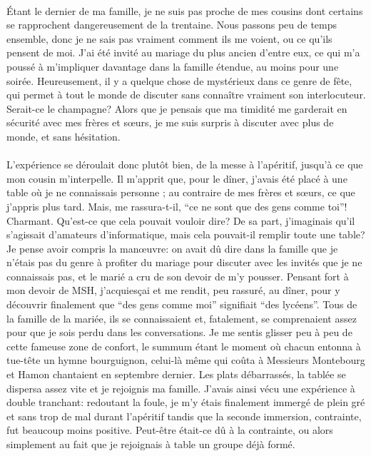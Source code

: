 \paragraph{} Étant le dernier de ma famille, je ne suis pas proche de mes
cousins dont certains se rapprochent dangereusement de la trentaine. Nous
passons peu de temps ensemble, donc je ne sais pas vraiment comment ils me
voient, ou ce qu'ils pensent de moi. J'ai été invité au mariage du plus ancien
d'entre eux, ce qui m'a poussé à m'impliquer davantage dans la famille étendue,
au moins pour une soirée. Heureusement, il y a quelque chose de mystérieux dans
ce genre de fête, qui permet à tout le monde de discuter sans connaître
vraiment son interlocuteur. Serait-ce le champagne? Alors que je pensais que
ma timidité me garderait en sécurité avec mes frères et sœurs, je me suis
surpris à discuter avec plus de monde, et sans hésitation.

\paragraph{} L'expérience se déroulait donc plutôt bien, de la messe à
l'apéritif, jusqu'à ce que mon cousin m'interpelle. Il m'apprit que, pour le
dîner, j'avais été placé à une table où je ne connaissais personne ; au
contraire de mes frères et sœurs, ce que j'appris plus tard. Mais, me
rassura-t-il, ``ce ne sont que des gens comme toi''! Charmant. Qu'est-ce que
cela pouvait vouloir dire? De sa part, j'imaginais qu'il s'agissait d'amateurs
d'informatique, mais cela pouvait-il remplir toute une table? Je pense avoir
compris la manœuvre: on avait dû dire dans la famille que je n'étais pas du
genre à profiter du mariage pour discuter avec les invités que je ne
connaissais pas, et le marié a cru de son devoir de m'y pousser. Pensant fort à
mon devoir de MSH, j'acquiesçai et me rendit, peu rassuré, au dîner, pour y
découvrir finalement que “des gens comme moi” signifiait “des lycéens”. Tous de
la famille de la mariée, ils se connaissaient et, fatalement, se comprenaient
assez pour que je sois perdu dans les conversations. Je me sentis glisser peu à
peu de cette fameuse zone de confort, le summum étant le moment où chacun
entonna à tue-tête un hymne bourguignon, celui-là même qui coûta à Messieurs
Montebourg et Hamon chantaient en septembre dernier.  Les plats débarrassés, la
tablée se dispersa assez vite et je rejoignis ma famille. J'avais ainsi vécu
une expérience à double tranchant: redoutant la foule, je m'y étais finalement
immergé de plein gré et sans trop de mal durant l'apéritif tandis que la
seconde immersion, contrainte, fut beaucoup moins positive. Peut-être était-ce
dû à la contrainte, ou alors simplement au fait que je rejoignais à table un
groupe déjà formé.


